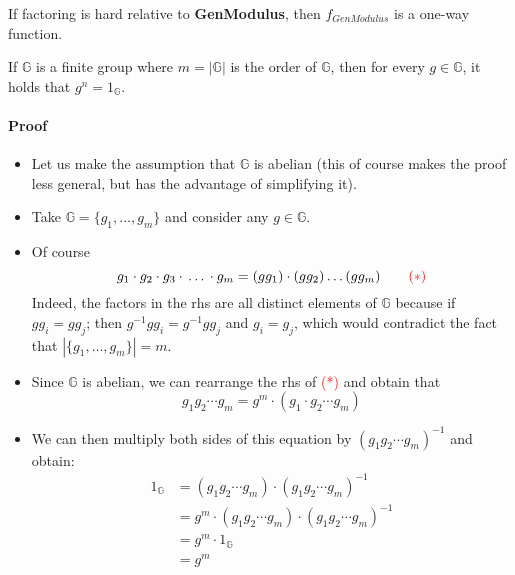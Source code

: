 \documentclass[../main]{subfiles}
\begin{document}
\begin{theorem}
	If factoring is hard relative to \textbf{GenModulus}, then $f_{GenModulus}$ is a one-way function.
\end{theorem}

\begin{theorem}
	If $\mathbb{G}$ is a finite group where $m = |\mathbb{G}|$ is the order of $\mathbb{G}$, then for every $g \in{} \mathbb{G}$, it holds that $g^n = 1_{\mathbb{G}}$.
\end{theorem}

\paragraph{Proof}
	\begin{itemize}
		\item Let us make the assumption that $\mathbb{G}$ is abelian (this of course makes the proof less general, but has the advantage of simplifying it).
		\item Take $\mathbb{G} = \{g_1, \ldots, g_m\}$ and consider any $g \in{} \mathbb{G}$.
		\item Of course
				$$g_1 \cdot{} g_2 \cdot{} g_3 \cdot{} \ldots{} \cdot{} g_m = (gg_1)\cdot{}(gg_2)\ldots(gg_m) \quad\quad \textcolor{red}{(*)}$$
				Indeed, the factors in the rhs are all distinct elements of $\mathbb{G}$ because if $gg_i = gg_j$;
				\newline
				then $g^{-1}gg_i = g^{-1}gg_j$ and $g_i = g_j$, which would contradict the fact that $|\{g_1, \ldots, g_m\}| = m$.
		\item Since $\mathbb{G}$ is abelian, we can rearrange the rhs of \textcolor{red}{(*)} and obtain that
				$$g_1g_2 \cdots{} g_m = g^m \cdot{} (g_1 \cdot{} g_2 \cdots g_m)$$
		\item We can then multiply both sides of this equation by $(g_1 g_2 \cdots{} g_m)^{-1}$ and obtain:
				\begin{align*}
					1_{\mathbb{G}} &= (g_1 g_2 \cdots{} g_m) \cdot (g_1 g_2 \cdots{} g_m)^{-1}	\\
					&= g^m \cdot (g_1 g_2 \cdots{} g_m) \cdot (g_1 g_2 \cdots{} g_m)^{-1}		\\
					&= g^m \cdot 1_{\mathbb{G}}										\\
					&= g^m
				\end{align*}
	\end{itemize}
\end{document}
